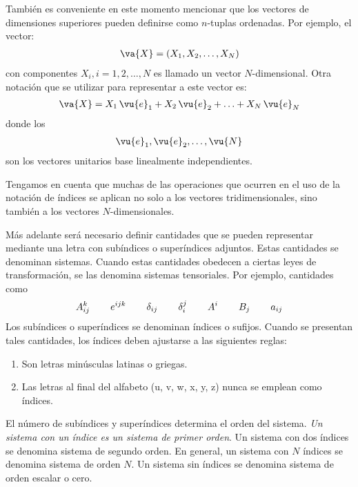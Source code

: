 \par
También es conveniente en este momento mencionar que los vectores de dimensiones superiores pueden definirse como $n$-tuplas ordenadas. Por ejemplo, el vector:
\begin{align*}
\va{X} = (X_{1}, X_{2}, \ldots, X_{N})
\end{align*}
con componentes $X_{i}, i =1, 2, \ldots, N$ es llamado un vector $N$-dimensional. Otra notación que se utilizar para representar a este vector es:
\begin{align*}
\va{X} = X_{1} \, \vu{e}_{1} +  X_{2} \, \vu{e}_{2} +  \ldots +  X_{N} \, \vu{e}_{N}
\end{align*}
donde los
\begin{align*}
\vu{e}_{1}, \vu{e}_{2}, \ldots, \vu{N}
\end{align*}
son los vectores unitarios base linealmente independientes.
\par
Tengamos en cuenta que muchas de las operaciones que ocurren en el uso de la notación de índices se aplican no solo a los vectores tridimensionales, sino también a los vectores $N$-dimensionales.
\par
Más adelante será necesario definir cantidades que se pueden representar mediante una letra con subíndices o superíndices adjuntos. Estas cantidades se denominan sistemas. Cuando estas cantidades obedecen a ciertas leyes de transformación, se las denomina sistemas tensoriales. Por ejemplo, cantidades como
\begin{align*}
A_{ij}^{k} \hspace{0.75cm} e^{ijk} \hspace{0.75cm} \delta_{ij} \hspace{0.75cm} \delta_{i}^{j} \hspace{0.75cm} A^{i} \hspace{0.75cm} B_{j} \hspace{0.75cm} a_{ij}
\end{align*}
Los subíndices o superíndices se denominan índices o sufijos. Cuando se presentan tales cantidades, los índices deben ajustarse a las siguientes reglas:
\begin{enumerate}
\item Son letras minúsculas latinas o griegas.
\item Las letras al final del alfabeto (u, v, w, x, y, z) nunca se emplean como índices.
\end{enumerate}
El número de subíndices y superíndices determina el orden del sistema. \emph{Un sistema con un índice es un sistema de primer orden}. Un sistema con dos índices se denomina sistema de segundo orden. En general, un sistema con $N$ índices se denomina sistema de orden $N$. Un sistema sin índices se denomina sistema de orden escalar o cero.
